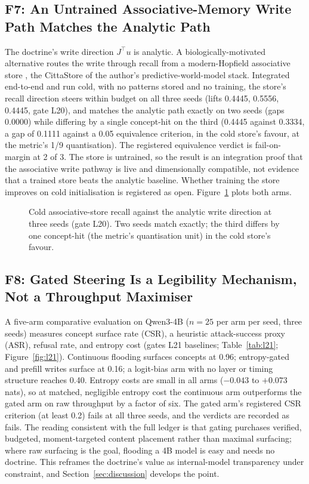 \subsection{F7: An Untrained Associative-Memory Write Path Matches the Analytic Path}
\label{sec:results:bridge}

The doctrine's write direction $J^{\top}u$ is analytic. A biologically-motivated alternative routes the write through recall from a modern-Hopfield associative store \cite{Ramsauer2021}, the CittaStore of the author's predictive-world-model stack. Integrated end-to-end and run cold, with no patterns stored and no training, the store's recall direction steers within budget on all three seeds (lifts 0.4445, 0.5556, 0.4445, gate L20), and matches the analytic path exactly on two seeds (gaps 0.0000) while differing by a single concept-hit on the third (0.4445 against 0.3334, a gap of 0.1111 against a 0.05 equivalence criterion, in the cold store's favour, at the metric's 1/9 quantisation). The registered equivalence verdict is fail-on-margin at 2 of 3. The store is untrained, so the result is an integration proof that the associative write pathway is live and dimensionally compatible, not evidence that a trained store beats the analytic baseline. Whether training the store improves on cold initialisation is registered as open. Figure~\ref{fig:l20} plots both arms.

\begin{figure}[t]
\centering
\resizebox{\columnwidth}{!}{}
\caption{Cold associative-store recall against the analytic write direction at three seeds (gate L20). Two seeds match exactly; the third differs by one concept-hit (the metric's quantisation unit) in the cold store's favour.}
\label{fig:l20}
\end{figure}

\subsection{F8: Gated Steering Is a Legibility Mechanism, Not a Throughput Maximiser}
\label{sec:results:l21}

A five-arm comparative evaluation on Qwen3-4B ($n=25$ per arm per seed, three seeds) measures concept surface rate (CSR), a heuristic attack-success proxy (ASR), refusal rate, and entropy cost (gates L21 baselines; Table~\ref{tab:l21}; Figure~\ref{fig:l21}). Continuous flooding surfaces concepts at 0.96; entropy-gated and prefill writes surface at 0.16; a logit-bias arm with no layer or timing structure reaches 0.40. Entropy costs are small in all arms ($-0.043$ to $+0.073$ nats), so at matched, negligible entropy cost the continuous arm outperforms the gated arm on raw throughput by a factor of six. The gated arm's registered CSR criterion (at least 0.2) fails at all three seeds, and the verdicts are recorded as fails. The reading consistent with the full ledger is that gating purchases verified, budgeted, moment-targeted content placement rather than maximal surfacing; where raw surfacing is the goal, flooding a 4B model is easy and needs no doctrine. This reframes the doctrine's value as internal-model transparency under constraint, and Section~\ref{sec:discussion} develops the point.

